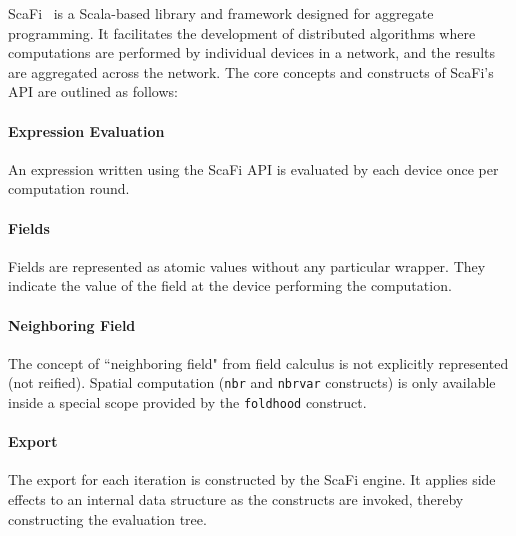 ScaFi~\cite{Casadei2022} is a Scala-based library and framework designed for aggregate programming. It facilitates the development of distributed algorithms where computations are performed by individual devices in a network, and the results are aggregated across the network. The core concepts and constructs of ScaFi's API are outlined as follows:

\paragraph{Expression Evaluation}
An expression written using the ScaFi API is evaluated by each device once per computation round.

\paragraph{Fields}
Fields are represented as atomic values without any particular wrapper. They indicate the value of the field at the device performing the computation.

\paragraph{Neighboring Field}
The concept of ``neighboring field" from field calculus is not explicitly represented (not reified). Spatial computation (\texttt{nbr} and \texttt{nbrvar} constructs) is only available inside a special scope provided by the \texttt{foldhood} construct.

\paragraph{Export}
The export for each iteration is constructed by the ScaFi engine. It applies side effects to an internal data structure as the constructs are invoked, thereby constructing the evaluation tree.

